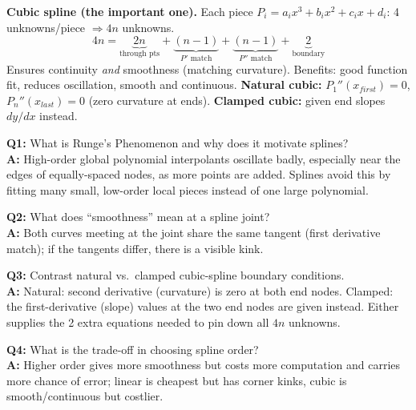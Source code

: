 \textbf{Cubic spline (the important one).} Each piece $P_i=a_ix^3+b_ix^2+c_ix+d_i$: 4 unknowns/piece $\Rightarrow 4n$ unknowns.
\[
4n = \underbrace{2n}_{\text{through pts}} + \underbrace{(n-1)}_{P'\text{ match}} + \underbrace{(n-1)}_{P''\text{ match}} + \underbrace{2}_{\text{boundary}}
\]
Ensures continuity \emph{and} smoothness (matching curvature). Benefits: good function fit, reduces oscillation, smooth and continuous. \textbf{Natural cubic:} $P_1''(x_{first})=0$, $P_n''(x_{last})=0$ (zero curvature at ends). \textbf{Clamped cubic:} given end slopes $dy/dx$ instead.

\begin{qabox}
\textbf{Q1:} What is Runge's Phenomenon and why does it motivate splines? \\
\textbf{A:} High-order global polynomial interpolants oscillate badly, especially near the edges of equally-spaced nodes, as more points are added. Splines avoid this by fitting many small, low-order local pieces instead of one large polynomial.

\textbf{Q2:} What does ``smoothness'' mean at a spline joint? \\
\textbf{A:} Both curves meeting at the joint share the same tangent (first derivative match); if the tangents differ, there is a visible kink.

\textbf{Q3:} Contrast natural vs.\ clamped cubic-spline boundary conditions. \\
\textbf{A:} Natural: second derivative (curvature) is zero at both end nodes. Clamped: the first-derivative (slope) values at the two end nodes are given instead. Either supplies the 2 extra equations needed to pin down all $4n$ unknowns.

\textbf{Q4:} What is the trade-off in choosing spline order? \\
\textbf{A:} Higher order gives more smoothness but costs more computation and carries more chance of error; linear is cheapest but has corner kinks, cubic is smooth/continuous but costlier.
\end{qabox}
